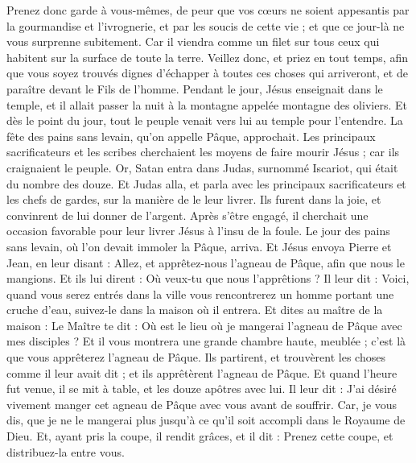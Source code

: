 \begin{multicols}{2}
Prenez donc garde à vous-mêmes, de peur que vos cœurs ne soient appesantis par la gourmandise et l'ivrognerie, et par les soucis de cette vie ; et que ce jour-là ne vous surprenne subitement.
Car il viendra comme un filet sur tous ceux qui habitent sur la surface de toute la terre.
Veillez donc, et priez en tout temps, afin que vous soyez trouvés dignes d’échapper à toutes ces choses qui arriveront, et de paraître devant le Fils de l'homme.
Pendant le jour, Jésus enseignait dans le temple, et il allait passer la nuit à la montagne appelée montagne des oliviers.
Et dès le point du jour, tout le peuple venait vers lui au temple pour l'entendre.
\VerseOne{}La fête des pains sans levain, qu'on appelle Pâque, approchait.
Les principaux sacrificateurs et les scribes cherchaient les moyens de faire mourir Jésus ; car ils craignaient le peuple.
Or, Satan entra dans Judas, surnommé Iscariot, qui était du nombre des douze.
Et Judas alla, et parla avec les principaux sacrificateurs et les chefs de gardes, sur la manière de le leur livrer.
Ils furent dans la joie, et convinrent de lui donner de l'argent.
Après s’être engagé, il cherchait une occasion favorable pour leur livrer Jésus à l’insu de la foule.
\TextTitle{[La pâque]}
Le jour des pains sans levain, où l’on devait immoler la Pâque, arriva.
Et Jésus envoya Pierre et Jean, en leur disant : Allez, et apprêtez-nous l'agneau de Pâque, afin que nous le mangions.
Et ils lui dirent : Où veux-tu que nous l'apprêtions ?
Il leur dit : Voici, quand vous serez entrés dans la ville vous rencontrerez un homme portant une cruche d'eau, suivez-le dans la maison où il entrera.
Et dites au maître de la maison : Le Maître te dit : Où est le lieu où je mangerai l'agneau de Pâque avec mes disciples ?
Et il vous montrera une grande chambre haute, meublée ; c’est là que vous apprêterez l'agneau de Pâque.
Ils partirent, et trouvèrent les choses comme il leur avait dit ; et ils apprêtèrent l'agneau de Pâque.
Et quand l'heure fut venue, il se mit à table, et les douze apôtres avec lui.
Il leur dit : J'ai désiré vivement manger cet agneau de Pâque avec vous avant de souffrir.
Car, je vous dis, que je ne le mangerai plus jusqu'à ce qu'il soit accompli dans le Royaume de Dieu.
Et, ayant pris la coupe, il rendit grâces, et il dit : Prenez cette coupe, et distribuez-la entre vous.

\end{multicols}
